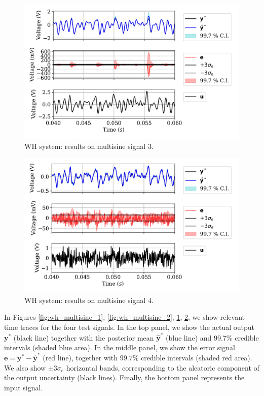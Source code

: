 \documentclass{ifacconf}
\newcommand{\tvec}[1]{{\mathbf{#1}}}
\newcommand{\mean}[1]{\hat{#1}}
\begin{document}
\begin{figure}%
 \centering
 \includegraphics[width=.99\linewidth]{img/MULTISINE_3.pdf}
 \caption{WH system: results on multisine signal 3.}
 \label{fig:wh_multisine_3}
\end{figure}

\begin{figure}%
 \centering
 \includegraphics[width=.99\linewidth]{img/MULTISINE_4.pdf}
 \caption{WH system: results on multisine signal 4.}
 \label{fig:wh_multisine_4}
\end{figure}

In Figures \ref{fig:wh_multisine_1}, \ref{fig:wh_multisine_2}, \ref{fig:wh_multisine_3}, \ref{fig:wh_multisine_4}, we show relevant time traces for the four test signals. In the top panel, we show the actual output $\tvec{y}^*$ (black line) together with the posterior mean $\mean{\tvec{y}}^*$ (blue line) and 99.7\% credible intervals (shaded blue area). In the middle panel, we show the error signal $\tvec{e}= \tvec{y}^*-\mean{\tvec{y}}^*$ (red line), together with 99.7\% credible intervals (shaded red area). We also show  $\pm 3 \sigma_e$ horizontal bands, corresponding to the aleatoric component of the output uncertainty  (black lines). Finally, the bottom panel represents the input signal. 
\end{document}
